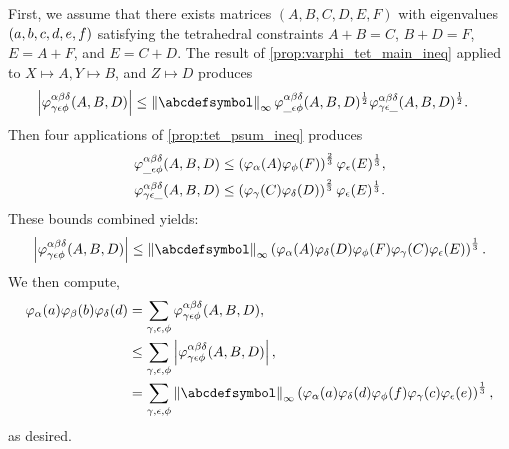 \documentclass[notitlepage, 11pt, letterpaper]{amsart}
\begin{document}
First, we assume that there exists matrices $(A,B,C,D,E,F)$ with eigenvalues
$(a,b,c,d,e,f)$ satisfying the tetrahedral constraints $A+B=C$, $B+D=F$, $E=A+F$, and $E=C+D$.
The result of \cref{prop:varphi_tet_main_ineq} applied to $X \mapsto A, Y \mapsto B$, and $Z \mapsto D$ produces
\begin{align}
    \begin{split}
        \left|\vp^{\ya\yb\yd}_{\yc\ye\yf}(A,B,D)\right|
        &\leq \norm{\abcdefsymbol}_{\infty} \vp^{\ya\yb\yd}_{\_\ye\yf}(A,B,D)^{\frac{1}{2}} \vp^{\ya\yb\yd}_{\yc\ye\_}(A,B,D)^{\frac{1}{2}}.
    \end{split}
\end{align}
Then four applications of \cref{prop:tet_psum_ineq} produces
\begin{align}
    \begin{split}
        \varphi^{\alpha\beta\delta}_{\_\epsilon\phi}(A, B, D) &\leq \left(\varphi_\alpha(A) \varphi_\phi(F)\right)^{\frac{2}{3}} \varphi_\epsilon(E)^{\frac{1}{3}}, \\
        \varphi^{\alpha\beta\delta}_{\gamma\epsilon\_}(A,B,D) &\leq \left( \varphi_\gamma(C) \varphi_\delta(D)\right)^{\frac{2}{3}} \varphi_\epsilon(E)^{\frac{1}{3}}.
    \end{split}
\end{align}
These bounds combined yields:
\begin{equation}
    \label{eq:vp_ABD_abs_bound}
    \left|\vp^{\ya\yb\yd}_{\yc\ye\yf}(A,B,D)\right|
    \leq \norm{\abcdefsymbol}_{\infty}
    \left( \vp_{\ya}(A) \vp_{\yd}(D) \vp_{\yf}(F)\vp_{\yc}(C)\vp_{\ye}(E)\right)^{\frac{1}{3}}.
\end{equation}
We then compute,
\begin{align}
    \begin{split}
        \vp_{\ya}(\ea)\vp_{\yb}(\eb)\vp_{\yd}(\ed)
        &= \sum_{\yc,\ye,\yf}\vp^{\ya\yb\yd}_{\yc\ye\yf}(A,B,D), \\
        &\leq \sum_{\yc,\ye,\yf} \left|\vp^{\ya\yb\yd}_{\yc\ye\yf}(A,B,D)\right|, \\
        &= \sum_{\yc,\ye,\yf} \norm{\abcdefsymbol}_{\infty}
        \left( \vp_{\ya}(\ea) \vp_{\yd}(\ed) \vp_{\yf}(\ef)\vp_{\yc}(\ec)\vp_{\ye}(\ee)\right)^{\frac{1}{3}},
    \end{split}
\end{align}
as desired.
\end{document}
